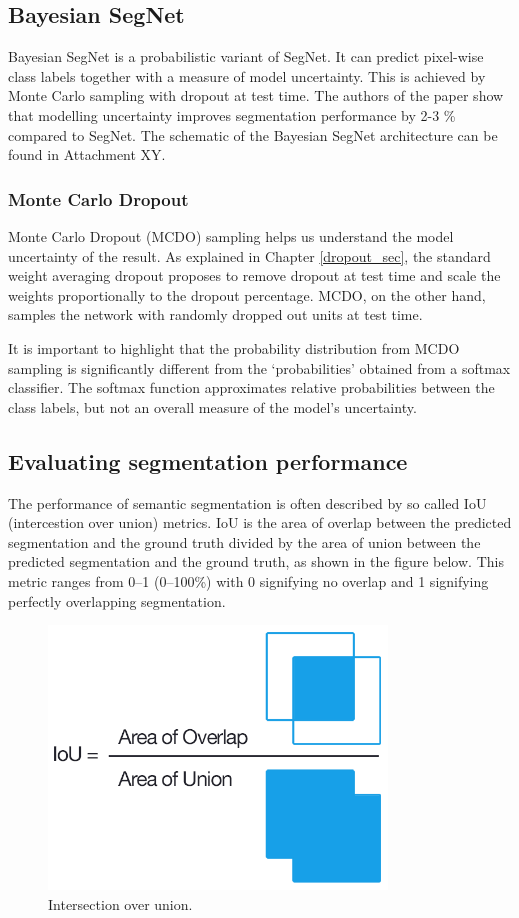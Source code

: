 \subsection{Bayesian SegNet}

Bayesian SegNet is a probabilistic variant of SegNet. It can predict pixel-wise class labels together with a measure of model uncertainty.  This is achieved by Monte Carlo sampling with dropout at test time. The authors of the paper show that modelling uncertainty improves segmentation performance by 2-3 \% compared to SegNet. The schematic of the Bayesian SegNet architecture can be found in Attachment XY. \cite{bayesian}

\subsubsection{Monte Carlo Dropout}

Monte Carlo Dropout (MCDO) sampling helps us understand the model uncertainty of the result. As explained in Chapter \ref{dropout_sec}, the standard weight averaging dropout proposes to remove dropout at test time and scale the weights proportionally to the dropout percentage. MCDO, on the other hand, samples the network with randomly dropped out units at test time. \cite{bayesian}

It is important to highlight that the probability distribution from MCDO sampling is significantly different from the ‘probabilities’ obtained from a softmax classifier. The softmax function approximates relative probabilities between the class labels, but not an overall measure of the model’s uncertainty. \cite{bayesian}

\subsection{Evaluating segmentation performance}

The performance of semantic segmentation is often described by so called IoU (intercestion over union) metrics. IoU is the area of overlap between the predicted segmentation and the ground truth divided by the area of union between the predicted segmentation and the ground truth, as shown in the figure below. This metric ranges from 0–1 (0–100\%) with 0 signifying no overlap and 1 signifying perfectly overlapping segmentation. \cite{iou}

\vspace{4mm}
\begin{figure}[h]
	\begin{center}
		\includegraphics*[width=9cm, keepaspectratio]{obr/iou.png}
	\end{center}
	\vspace{4mm}
	\caption{Intersection over union. \cite{iou}} 
	\label{iou}
\end{figure}




